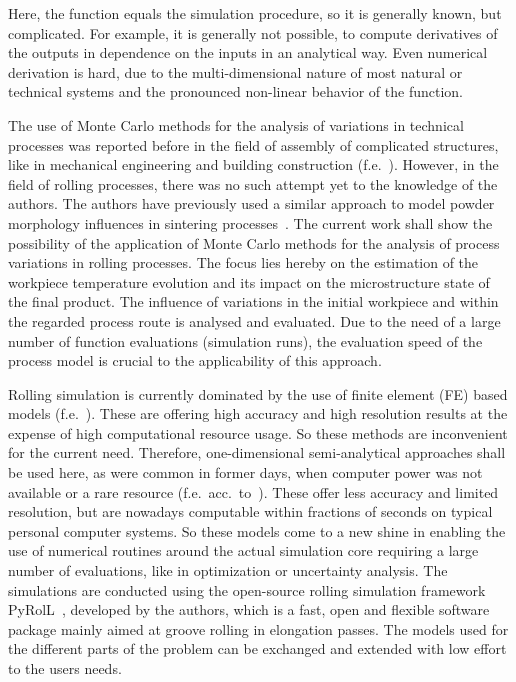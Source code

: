 Here, the function equals the simulation procedure, so it is generally known, but complicated.
For example, it is generally not possible, to compute derivatives of the outputs in dependence on the inputs in an analytical way.
Even numerical derivation is hard, due to the multi-dimensional nature of most natural or technical systems and the pronounced non-linear behavior of the function.

The use of Monte Carlo methods for the analysis of variations in technical processes was reported before in the field of assembly of complicated structures, like in mechanical engineering and building construction (f.e.~\cite{Lin1997, Shen2005, Dantan2009, Qureshi2012, Yan2015, Rausch2019}).
However, in the field of rolling processes, there was no such attempt yet to the knowledge of the authors.
The authors have previously used a similar approach to model powder morphology influences in sintering processes~\cite{Weiner2022, Weiner2022b}.
The current work shall show the possibility of the application of Monte Carlo methods for the analysis of process variations in rolling processes.
The focus lies hereby on the estimation of the workpiece temperature evolution and its impact on the microstructure state of the final product.
The influence of variations in the initial workpiece and within the regarded process route is analysed and evaluated.
Due to the need of a large number of function evaluations (simulation runs), the evaluation speed of the process model is crucial to the applicability of this approach.

Rolling simulation is currently dominated by the use of finite element (FE) based models (f.e.~\cite{Kim2005, Liu2002, Takashima2014}).
These are offering high accuracy and high resolution results at the expense of high computational resource usage.
So these methods are inconvenient for the current need.
Therefore, one-dimensional semi-analytical approaches shall be used here, as were common in former days, when computer power was not available or a rare resource (f.e.~acc.~to~\textcite{Hensel1978, Wusatowski1969, Lendl1948, Sims1954}).
These offer less accuracy and limited resolution, but are nowadays computable within fractions of seconds on typical personal computer systems.
So these models come to a new shine in enabling the use of numerical routines around the actual simulation core requiring a large number of evaluations, like in optimization or uncertainty analysis.
The simulations are conducted using the open-source rolling simulation framework PyRolL~\cite{pyroll_jors}, developed by the authors, which is a fast, open and flexible software package mainly aimed at groove rolling in elongation passes.
The models used for the different parts of the problem can be exchanged and extended with low effort to the users needs.

